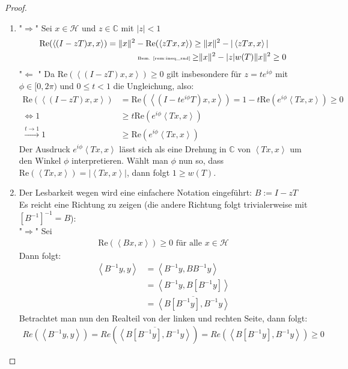 \begin{proof}
	\begin{enumerate}[label=(\roman*)]
		\item "$\Rightarrow$" Sei $x\in \mathcal{H}$ und $z \in \mathbb{C}$ mit $|z|<1$ \begin{align}
			\mathrm{Re}( \left< (I - zT)x,x \right> ) = \|x\|^2 - \mathrm{Re}(\left< zTx,x \right> ) &\ge \|x\|^2 - |\left< zTx,x \right> | \nonumber \\ 
			\text{\tiny Bem. \ref{rem:ineq_rad} }&{\ge} \|x\|^2 -|z| w(T) \|x\|^2 \ge 0
		\end{align}
		"$\Leftarrow$ "  Da $\mathrm{Re}( \left< (I - zT)x,x \right> ) \ge 0$ gilt insbesondere für $z=t e^{i\phi}$ mit $\phi \in [0, 2\pi)$ und $0 \le t < 1$ die Ungleichung, also:
		\begin{align}
			\mathrm{Re}( \left< (I - zT)x,x \right> ) &= \mathrm{Re}( \left< (I - te^{i\phi}T)x,x \right> ) = 1 -t \mathrm{Re}(e^{i\phi}\left< Tx,x \right> ) \ge 0 \nonumber \\
			\iff 1 &\ge t \mathrm{Re}(e^{i\phi}\left< Tx,x \right> ) \nonumber \\
			\overset{t \rightarrow 1}{\longrightarrow} 1 &\ge \mathrm{Re}(e^{i\phi}\left< Tx,x \right> )
		\end{align}
		Der Ausdruck $e^{i\phi}\left< Tx,x \right>$ lässt sich als eine Drehung in $\mathbb{C}$ von $\left< Tx,x \right>$ um den Winkel $\phi$ interpretieren. Wählt man $\phi$ nun so, dass $\mathrm{Re}(\left< Tx,x \right>) = |\left< Tx,x \right> |$, dann folgt $1 \ge w(T)$.

		\item Der Lesbarkeit wegen wird eine einfachere Notation eingeführt: $B:=I - zT$ Es reicht eine Richtung zu zeigen (die andere Richtung folgt trivialerweise mit $[B^{-1}]^{-1} = B$): \\
		"$\Rightarrow$" Sei 
		\begin{align}
			\mathrm{Re}( \left< Bx,x \right> ) \ge 0 \text{ für alle } x \in \mathcal{H}
		\end{align}
		Dann folgt:
		\begin{align}
			\left< B^{-1}y,y \right> &= \left< B^{-1}y, BB^{-1}y \right> \nonumber \\ 
			&= \left< B^{-1}y, B [B^{-1}y] \right> \nonumber \\
			&= \overline{ \left< B [B^{-1}y], B^{-1}y \right> }
		\end{align}
		Betrachtet man nun den Realteil von der linken und rechten Seite, dann folgt:
		\begin{align}
			Re(\left< B^{-1}y,y \right>) = Re(\overline{ \left< B [B^{-1}y], B^{-1}y \right> }) = Re(\left< B [B^{-1}y], B^{-1}y \right>) \ge 0
		\end{align}
	\end{enumerate}
	 
\end{proof}

